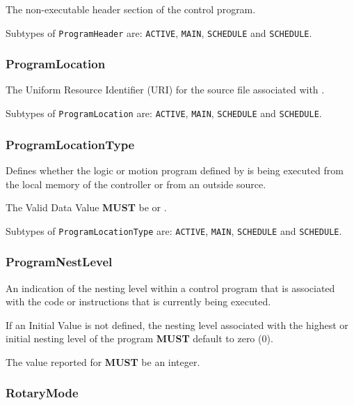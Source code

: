 The non-executable header section of the control program.


Subtypes of \texttt{ProgramHeader} are: \texttt{ACTIVE}, \texttt{MAIN}, \texttt{SCHEDULE} and \texttt{SCHEDULE}. 
\FloatBarrier

\subsubsection{ProgramLocation}
  \label{sec:ProgramLocation}



The Uniform Resource Identifier (URI) for the source file associated with .


Subtypes of \texttt{ProgramLocation} are: \texttt{ACTIVE}, \texttt{MAIN}, \texttt{SCHEDULE} and \texttt{SCHEDULE}. 
\FloatBarrier

\subsubsection{ProgramLocationType}
  \label{sec:ProgramLocationType}



Defines whether the logic or motion program defined by  is being executed from the local memory of the controller or from an outside source.
  
 The \gls{Valid Data Value} \textbf{MUST} be  or .


Subtypes of \texttt{ProgramLocationType} are: \texttt{ACTIVE}, \texttt{MAIN}, \texttt{SCHEDULE} and \texttt{SCHEDULE}. 
\FloatBarrier

\subsubsection{ProgramNestLevel}
  \label{sec:ProgramNestLevel}



An indication of the nesting level within a control program that is associated with the code or instructions that is currently being executed.
  
 If an Initial Value is not defined, the nesting level associated with the highest or initial nesting level of the program \textbf{MUST} default to zero (0).
  
 The value reported for  \textbf{MUST} be an integer.

\FloatBarrier

\subsubsection{RotaryMode}
  \label{sec:RotaryMode}



